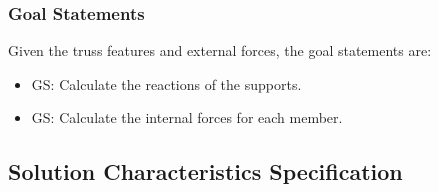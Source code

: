 \documentclass[12pt]{article}
\newcounter{goalnum} %
\begin{document}
\subsubsection{Goal Statements} \label{Sec_gs}


\noindent Given the truss features and external forces, the goal statements are:

\begin{itemize}
\item{GS\thegoalnum \label{G_react}: Calculate the reactions of the supports.}
\item{GS\thegoalnum \label{G_force}: Calculate the internal forces for each member.}
\end{itemize}

\subsection{Solution Characteristics Specification}


\end{document}
